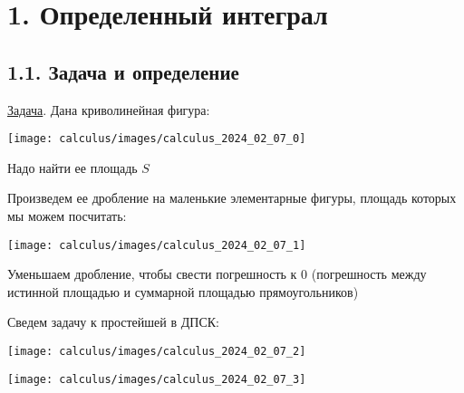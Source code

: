 \documentclass[12pt]{article}
\begin{document}
    \section{1. Определенный интеграл}

    \subsection{1.1. Задача и определение}

    \underline{Задача}. Дана криволинейная фигура:

    \begin{center}
        \texttt{[image: calculus/images/calculus\_2024\_02\_07\_0]}
    \end{center}

    Надо найти ее площадь $S$

    Произведем ее дробление на маленькие элементарные фигуры, площадь которых мы можем посчитать:

    \begin{center}
        \texttt{[image: calculus/images/calculus\_2024\_02\_07\_1]}
    \end{center}

    Уменьшаем дробление, чтобы свести погрешность к 0 (погрешность между истинной площадью и суммарной площадью прямоугольников)

    Сведем задачу к простейшей в ДПСК:

    \vspace{10mm}


    \begin{multicols}{2}
        \texttt{[image: calculus/images/calculus\_2024\_02\_07\_2]}

        \texttt{[image: calculus/images/calculus\_2024\_02\_07\_3]}
    \end{multicols}
\end{document}
